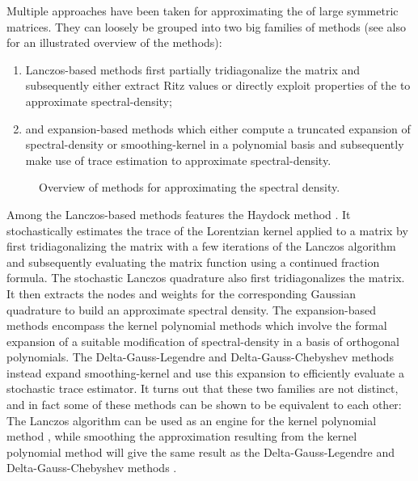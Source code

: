 Multiple approaches have been taken for approximating the 
of large symmetric matrices. They can loosely be grouped into two big families
of methods (see also  for an
illustrated overview of the methods):

\begin{enumerate}
    \item Lanczos-based methods first partially tridiagonalize the matrix and
    subsequently either extract Ritz values or directly exploit properties of the
     to approximate \gls{spectral-density};
    \item and expansion-based methods which either compute a truncated expansion of
    \gls{spectral-density} or \gls{smoothing-kernel} in a polynomial basis and subsequently
    make use of trace estimation to approximate \gls{spectral-density}.
\end{enumerate}

\begin{figure}[ht]
    \centering
    
    \caption{Overview of methods for approximating the spectral density.}
    \label{fig:1-introduction-literature-overview}
\end{figure}

Among the Lanczos-based methods features the Haydock method \cite{haydock1972electronic, lin2016review}.
It stochastically estimates the trace of the Lorentzian kernel applied to a matrix
by first tridiagonalizing the matrix with a few iterations of the Lanczos algorithm
\cite{lanczos1950iteration} and subsequently evaluating the matrix function using
a continued fraction formula. The stochastic Lanczos quadrature \cite{lin2016review, ubaru2017lanczos,chen2021slq}
also first tridiagonalizes the matrix. It then extracts the nodes and weights
for the corresponding Gaussian quadrature to build an approximate spectral density.
The expansion-based methods encompass the kernel polynomial methods \cite{silver1994kpm, wang1994kpm, weisse2006kpm}
which involve the formal expansion of a suitable modification of \gls{spectral-density}
in a basis of orthogonal polynomials. The Delta-Gauss-Legendre \cite{lin2016review}
and Delta-Gauss-Chebyshev \cite{lin2017randomized} methods instead expand \gls{smoothing-kernel}
and use this expansion to efficiently evaluate a stochastic trace estimator.
It turns out that these two families are not distinct, and in fact some of these
methods can be shown to be equivalent to each other: The Lanczos algorithm
can be used as an engine for the kernel polynomial method \cite{chen2023kpm},
while smoothing the approximation resulting from the kernel polynomial method 
will give the same result as the Delta-Gauss-Legendre and Delta-Gauss-Chebyshev
methods \cite{lin2016review}.\\ 


